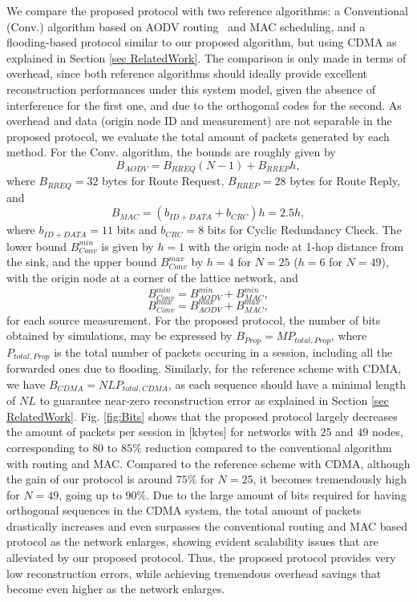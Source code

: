 \documentclass[letterpaper,conference]{IEEEtran}
\begin{document}
We compare the proposed protocol with two reference algorithms: a Conventional (Conv.) algorithm based on AODV routing~\cite{aodv} and MAC scheduling, and a flooding-based protocol similar to our proposed algorithm, but using CDMA as explained in Section \ref{sec RelatedWork}. The comparison is only made in terms of overhead, since both reference algorithms should ideally provide excellent reconstruction performances under this system model, given the absence of interference for the first one, and due to the orthogonal codes for the second.
As overhead and data (origin node ID and measurement) are not separable in the proposed protocol, we evaluate the total amount of packets generated by each method. For the Conv. algorithm, the bounds are roughly given by
\begin{equation}
B_{AODV}=B_{RREQ}(N-1) + B_{RREP} h,
\end{equation}
where $B_{RREQ}=32$ bytes for Route Request, $B_{RREP}=28$ bytes for Route Reply, and
 \begin{equation}
B_{MAC}=(b_{ID+DATA}+b_{CRC}) h=2.5h,
\end{equation}
where $b_{ID+DATA}=11$ bits and $b_{CRC}=8$ bits for Cyclic Redundancy Check. The lower bound $B_{Conv}^{min}$ is given by $h=1$ with the origin node at 1-hop distance from the sink, and the upper bound $B_{Conv}^{max}$ by $h=4$ for $N=25$ ($h=6$ for $N=49$), with the origin node at a corner of the lattice network, and
\begin{equation}
B_{Conv}^{min}=B_{AODV}^{min}+B_{MAC}^{min},
\end{equation}
\begin{equation}
B_{Conv}^{max}=B_{AODV}^{max}+B_{MAC}^{max},
\end{equation}
for each source measurement.
For the proposed protocol, the number of bits obtained by simulations, may be expressed by $B_{Prop}=M P_{total,Prop}$, where $P_{total,Prop}$ is the total number of packets occuring in a session, including all the forwarded ones due to flooding.
Similarly, for the reference scheme with CDMA, we have $B_{CDMA}=NL P_{total,CDMA}$, as each sequence should have a minimal length of $NL$ to guarantee near-zero reconstruction error as explained in Section \ref{sec RelatedWork}.
Fig. \ref{fig:Bits} shows that the proposed protocol largely decreases the amount of packets per session in [kbytes] for networks with $25$ and $49$ nodes, corresponding to $80$ to $85\%$ reduction compared to the conventional algorithm with routing and MAC.
Compared to the reference scheme with CDMA, although the gain of our protocol is around $75\%$ for $N=25$, it becomes tremendously high for $N=49$, going up to $90\%$. Due to the large amount of bits required for having orthogonal sequences in the CDMA system, the total amount of packets drastically increases and even surpasses the conventional routing and MAC based protocol as the network enlarges, showing evident scalability issues that are alleviated by our proposed protocol.
Thus, the proposed protocol provides very low reconstruction errors, while achieving tremendous overhead savings that become even higher as the network enlarges.
\end{document}
